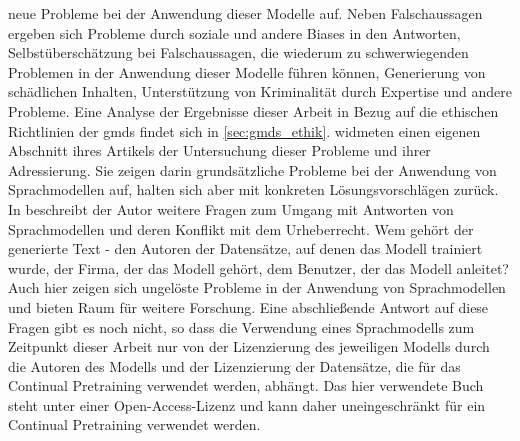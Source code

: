 neue Probleme bei der Anwendung dieser Modelle auf.
Neben Falschaussagen ergeben sich Probleme durch soziale und andere Biases in den Antworten, Selbstüberschätzung bei Falschaussagen, die wiederum zu schwerwiegenden Problemen in der Anwendung dieser Modelle führen können, Generierung von schädlichen Inhalten, Unterstützung von Kriminalität durch Expertise und andere Probleme. Eine Analyse der Ergebnisse dieser Arbeit in Bezug auf die ethischen Richtlinien der \ac{gmds} findet sich in \ref{sec:gmds_ethik}.
\citet{gpt4} widmeten einen eigenen Abschnitt ihres Artikels der Untersuchung dieser Probleme und ihrer Adressierung.
Sie zeigen darin grundsätzliche Probleme bei der Anwendung von Sprachmodellen auf, halten sich aber mit konkreten Lösungsvorschlägen zurück.\\

In \citet{plagiarism} beschreibt der Autor weitere Fragen zum Umgang mit Antworten von Sprachmodellen und deren Konflikt mit dem Urheberrecht.
Wem gehört der generierte Text - den Autoren der Datensätze, auf denen das Modell trainiert wurde, der Firma, der das Modell gehört, dem Benutzer, der das Modell anleitet? 
Auch hier zeigen sich ungelöste Probleme in der Anwendung von Sprachmodellen und bieten Raum für weitere Forschung. Eine abschließende Antwort auf diese Fragen gibt es noch nicht, so dass die Verwendung eines Sprachmodells zum Zeitpunkt dieser Arbeit nur von der Lizenzierung des jeweiligen Modells durch die Autoren des Modells und der Lizenzierung der Datensätze, die für das Continual Pretraining verwendet werden, abhängt. Das hier verwendete Buch \citet{bb} steht unter einer Open-Access-Lizenz und kann daher uneingeschränkt für ein Continual Pretraining verwendet werden.\\
